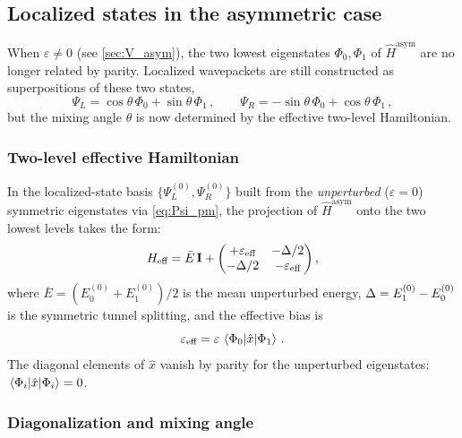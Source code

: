 \subsection{Localized states in the asymmetric case}\label{sec:localized_asym}

When $\varepsilon \neq 0$ (see \cref{sec:V_asym}), the two lowest eigenstates
$\Phi_0, \Phi_1$ of $\hat{H}^{\text{asym}}$ are no longer related by parity.
Localized wavepackets are still constructed as superpositions of these two states,
\begin{equation}\label{eq:psi_LR_asym}
  \Psi_L = \cos\theta\,\Phi_0 + \sin\theta\,\Phi_1\,,
  \qquad
  \Psi_R = -\sin\theta\,\Phi_0 + \cos\theta\,\Phi_1\,,
\end{equation}
but the mixing angle $\theta$ is now determined by the effective two-level Hamiltonian.

\subsubsection{Two-level effective Hamiltonian}

In the localized-state basis $\{\Psi_L^{(0)}, \Psi_R^{(0)}\}$ built from the
\emph{unperturbed} ($\varepsilon=0$) symmetric eigenstates via \cref{eq:Psi_pm},
the projection of $\hat{H}^{\text{asym}}$ onto the two lowest levels takes the form:
\begin{equation}
  H_{\text{eff}} = \bar{E}\,\mathbf{I}
  + \begin{pmatrix}
    +\varepsilon_{\text{eff}} & -\Delta/2 \\
    -\Delta/2 & -\varepsilon_{\text{eff}}
  \end{pmatrix},
\end{equation}
where $\bar{E} = (E_0^{(0)}+E_1^{(0)})/2$ is the mean unperturbed energy,
$\Delta = E_1^{(0)}-E_0^{(0)}$ is the symmetric tunnel splitting, and the
effective bias is
\begin{equation}
  \varepsilon_{\text{eff}} = \varepsilon\,\mel{\Phi_0}{\hat{x}}{\Phi_1}\,.
\end{equation}
The diagonal elements of $\hat{x}$ vanish by parity for the unperturbed eigenstates:
$\mel{\Phi_i}{\hat{x}}{\Phi_i} = 0$.

\subsubsection{Diagonalization and mixing angle}

